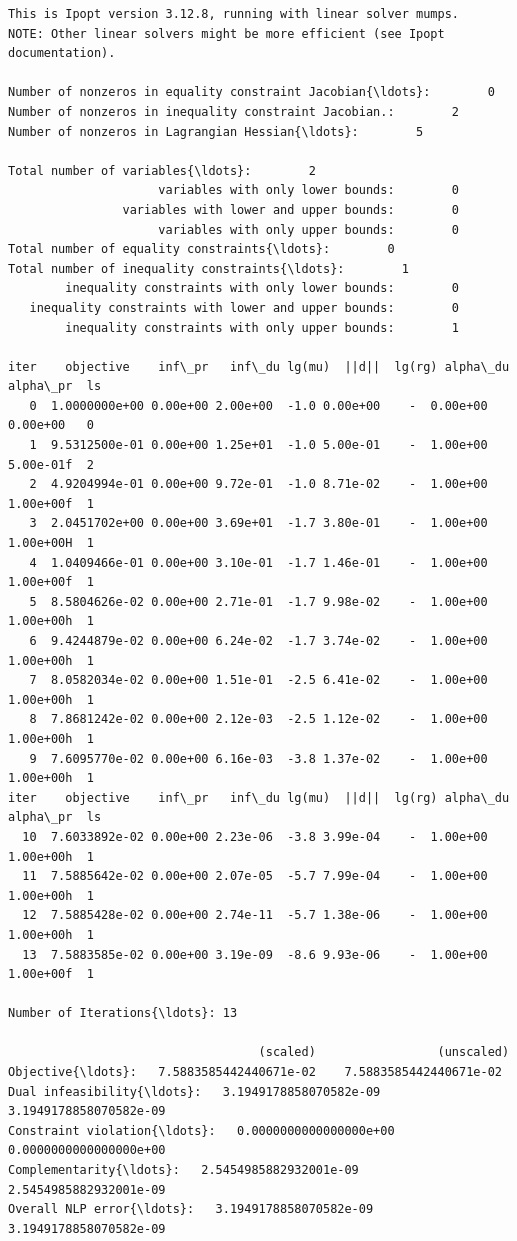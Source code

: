 \documentclass[11pt]{article}
\begin{document}
    \begin{Verbatim}[commandchars=\\\{\}]
This is Ipopt version 3.12.8, running with linear solver mumps.
NOTE: Other linear solvers might be more efficient (see Ipopt documentation).

Number of nonzeros in equality constraint Jacobian{\ldots}:        0
Number of nonzeros in inequality constraint Jacobian.:        2
Number of nonzeros in Lagrangian Hessian{\ldots}:        5

Total number of variables{\ldots}:        2
                     variables with only lower bounds:        0
                variables with lower and upper bounds:        0
                     variables with only upper bounds:        0
Total number of equality constraints{\ldots}:        0
Total number of inequality constraints{\ldots}:        1
        inequality constraints with only lower bounds:        0
   inequality constraints with lower and upper bounds:        0
        inequality constraints with only upper bounds:        1

iter    objective    inf\_pr   inf\_du lg(mu)  ||d||  lg(rg) alpha\_du alpha\_pr  ls
   0  1.0000000e+00 0.00e+00 2.00e+00  -1.0 0.00e+00    -  0.00e+00 0.00e+00   0
   1  9.5312500e-01 0.00e+00 1.25e+01  -1.0 5.00e-01    -  1.00e+00 5.00e-01f  2
   2  4.9204994e-01 0.00e+00 9.72e-01  -1.0 8.71e-02    -  1.00e+00 1.00e+00f  1
   3  2.0451702e+00 0.00e+00 3.69e+01  -1.7 3.80e-01    -  1.00e+00 1.00e+00H  1
   4  1.0409466e-01 0.00e+00 3.10e-01  -1.7 1.46e-01    -  1.00e+00 1.00e+00f  1
   5  8.5804626e-02 0.00e+00 2.71e-01  -1.7 9.98e-02    -  1.00e+00 1.00e+00h  1
   6  9.4244879e-02 0.00e+00 6.24e-02  -1.7 3.74e-02    -  1.00e+00 1.00e+00h  1
   7  8.0582034e-02 0.00e+00 1.51e-01  -2.5 6.41e-02    -  1.00e+00 1.00e+00h  1
   8  7.8681242e-02 0.00e+00 2.12e-03  -2.5 1.12e-02    -  1.00e+00 1.00e+00h  1
   9  7.6095770e-02 0.00e+00 6.16e-03  -3.8 1.37e-02    -  1.00e+00 1.00e+00h  1
iter    objective    inf\_pr   inf\_du lg(mu)  ||d||  lg(rg) alpha\_du alpha\_pr  ls
  10  7.6033892e-02 0.00e+00 2.23e-06  -3.8 3.99e-04    -  1.00e+00 1.00e+00h  1
  11  7.5885642e-02 0.00e+00 2.07e-05  -5.7 7.99e-04    -  1.00e+00 1.00e+00h  1
  12  7.5885428e-02 0.00e+00 2.74e-11  -5.7 1.38e-06    -  1.00e+00 1.00e+00h  1
  13  7.5883585e-02 0.00e+00 3.19e-09  -8.6 9.93e-06    -  1.00e+00 1.00e+00f  1

Number of Iterations{\ldots}: 13

                                   (scaled)                 (unscaled)
Objective{\ldots}:   7.5883585442440671e-02    7.5883585442440671e-02
Dual infeasibility{\ldots}:   3.1949178858070582e-09    3.1949178858070582e-09
Constraint violation{\ldots}:   0.0000000000000000e+00    0.0000000000000000e+00
Complementarity{\ldots}:   2.5454985882932001e-09    2.5454985882932001e-09
Overall NLP error{\ldots}:   3.1949178858070582e-09    3.1949178858070582e-09



\end{Verbatim}
\end{document}
